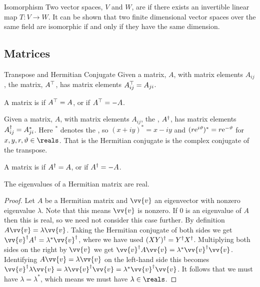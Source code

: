 \begin{dfn}{Isomorphism}{}
    Two vector spaces, \(V\) and \(W\), are  if there exists an invertible linear map \(T\colon V \to W\).
    It can be shown that two finite dimensional vector spaces over the same field are isomorphic if and only if they have the same dimension.
\end{dfn}

\subsection{Matrices}
\begin{dfn}{Transpose and Hermitian Conjugate}{}
    Given a matrix, \(A\), with matrix elements \(A_{ij}\), the  matrix, \(A^\top\), has matrix elements \(A^\top_{ij} = A_{ji}\).
    
    A matrix is  if \(A^\top = A\), or  if \(A^\top = -A\).
    
    Given a matrix, \(A\), with matrix elements \(A_{ij}\), the , \(A^\dagger\), has matrix elements \(A^\dagger_{ij} = A_{ji}^*\).
    Here \(^*\) denotes the , so \((x + iy)^* = x - iy\) and \((r\mathrm{e}^{i\vartheta})^* = r\mathrm{e}^{-\vartheta}\) for \(x, y, r, \vartheta \in \reals\).
    That is the Hermitian conjugate is the complex conjugate of the transpose.
    
    A matrix is  if \(A^\dagger = A\), or  if \(A^\dagger = -A\).
\end{dfn}

\begin{lma}{}{}
    The eigenvalues of a Hermitian matrix are real.
    \begin{proof}
        Let \(A\) be a Hermitian matrix and \(\vv{v}\) an eigenvector with nonzero eigenvalue \(\lambda\).
        Note that this means \(\vv{v}\) is nonzero.
        If \(0\) is an eigenvalue of \(A\) then this is real, so we need not consider this case further.
        By definition \(A\vv{v} = \lambda\vv{v}\).
        Taking the Hermitian conjugate of both sides we get \(\vv{v}^\hermit A^\hermit = \lambda^*\vv{v}^\hermit\), where we have used \((XY)^\dagger = Y^\dagger X^\dagger\).
        Multiplying both sides on the right by \(\vv{v}\) we get \(\vv{v}^\hermit A \vv{v} = \lambda^*\vv{v}^\hermit \vv{v}\).
        Identifying \(A\vv{v} = \lambda\vv{v}\) on the left-hand side this becomes \(\vv{v}^\hermit \lambda \vv{v} = \lambda\vv{v}^\hermit \vv{v} = \lambda^*\vv{v}^\hermit \vv{v}\).
        It follows that we must have \(\lambda = \lambda^*\), which means we must have \(\lambda \in \reals\).
    \end{proof}
\end{lma}

